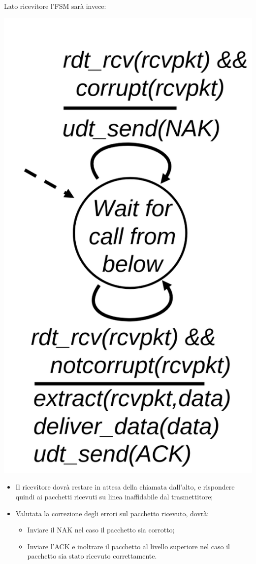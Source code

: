 \documentclass[a4paper,11pt]{article}
\begin{document}
Lato ricevitore l'FSM sarà invece:
\begin{center}
	\includegraphics[scale=0.18]{../figures/rdt2fsm2.png}
\end{center}
\begin{itemize}
	\item Il ricevitore dovrà restare in attesa della chiamata dall'alto, e rispondere quindi ai pacchetti ricevuti su linea inaffidabile dal trasmettitore;
	\item Valutata la correzione degli errori sul pacchetto ricevuto, dovrà:
		\begin{itemize}
			\item Inviare il NAK nel caso il pacchetto sia corrotto;
			\item Inviare l'ACK e inoltrare il pacchetto al livello superiore nel caso il pacchetto sia stato ricevuto correttamente.
		\end{itemize}
\end{itemize}
\end{document}
